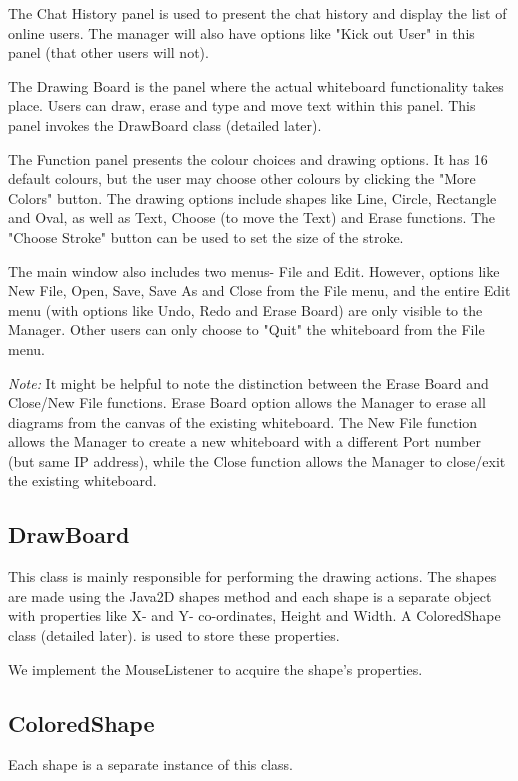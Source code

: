 \noindent The Chat History panel is used to present the chat history and display the list of online users. The manager will also have options like "Kick out User" in this panel (that other users will not).

\noindent The Drawing Board is the panel where the actual whiteboard functionality takes place. Users can draw, erase and type and move text within this panel. This panel invokes the DrawBoard class (detailed later).

\noindent The Function panel presents the colour choices and drawing options. It has 16 default colours, but the user may choose other colours by clicking the "More Colors" button. The drawing options include shapes like Line, Circle, Rectangle and Oval, as well as Text, Choose (to move the Text) and Erase functions. The "Choose Stroke" button can be used to set the size of the stroke.

\noindent The main window also includes two menus- File and Edit. However, options like New File, Open, Save, Save As and Close from the File menu, and the entire Edit menu (with options like Undo, Redo and Erase Board) are only visible to the Manager. Other users can only choose to "Quit" the whiteboard from the File menu.

\noindent \textit{Note:} It might be helpful to note the distinction between the Erase Board and Close/New File functions. Erase Board option allows the Manager to erase all diagrams from the canvas of the existing whiteboard. The New File function allows the Manager to create a new whiteboard with a different Port number (but same IP address), while the Close function allows the Manager to close/exit the existing whiteboard.
\subsection{DrawBoard}
This class is mainly responsible for performing the drawing actions. The shapes are made using the Java2D shapes method and each shape is a separate object with properties like X- and Y- co-ordinates, Height and Width. A ColoredShape class (detailed later). is used to store these properties.

\noindent We implement the MouseListener to acquire the shape's properties.
\subsection{ColoredShape}
Each shape is a separate instance of this class.

